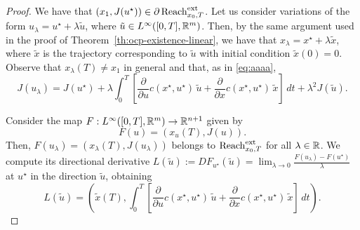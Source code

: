 \begin{proof}
    We have that $(x_1,J(u^\star))\in \partial \operatorname{Reach}^{\text{ext}}_{x_0,T}$. 
    Let us consider variations of the form $u_\lambda = u^\star + \lambda \tilde u$, where $\tilde u\in L^\infty([0,T],\mathbb{R}^m)$.
    Then, by the same argument used in the proof of Theorem~\ref{th:ocp-existence-linear}, we have that $x_\lambda = x^\star + \lambda \tilde x$, where $\tilde x$ is the trajectory corresponding to $\tilde u$ with initial condition $\tilde x(0)=0$. Observe that $x_\lambda(T)\neq x_1$ in general and that, as in \eqref{eq:aaaa}, 
    \begin{equation}
        \label{eq:aaaa2}
        J(u_\lambda) = J(u^\star) + \lambda \int_0^T \left[ \frac{\partial}{\partial u} c(x^\star, u^\star) \,\tilde u + \frac{\partial}{\partial x}c(x^\star, u^\star) \, \tilde x  \right] \, dt + \lambda^2 J(\tilde u).
    \end{equation}

    Consider the map $F:L^\infty([0,T],\mathbb{R}^m) \to \mathbb{R}^{n+1}$ given by
    \begin{equation}
        F(u) = (x_u(T), J(u)).
    \end{equation}
    Then, $F(u_\lambda) = (x_\lambda(T), J(u_\lambda))$ belongs to $\operatorname{Reach}^{\text{ext}}_{x_0,T}$ for all $\lambda\in \mathbb{R}$. 
    We compute its directional derivative $L(\tilde u):=DF_{u^\star}(\tilde u) 
        = \lim_{\lambda\to 0} \frac{F(u_\lambda)-F(u^\star)}{\lambda}$ at $u^\star$ in the direction $\tilde u$, obtaining
    \begin{equation}
        L(\tilde u)
        = \left( \tilde x(T), \int_0^T \left[ \frac{\partial}{\partial u} c(x^\star, u^\star) \, \tilde u + \frac{\partial}{\partial x}c(x^\star, u^\star) \, \tilde x  \right] \, dt   \right).
    \end{equation}


\end{proof}
